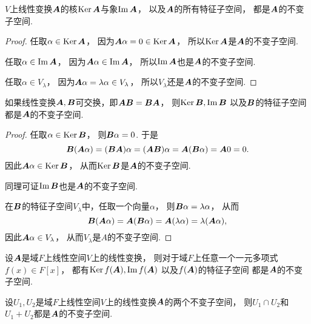\begin{proposition}%
\(V\)上线性变换\(\boldsymbol{A}\)的核\(\operatorname{Ker}\boldsymbol{A}\)与象\(\operatorname{Im}\boldsymbol{A}\)，
以及\(\boldsymbol{A}\)的所有特征子空间，
都是\(\boldsymbol{A}\)的不变子空间.
\begin{proof}
任取\(\alpha \in \operatorname{Ker}\boldsymbol{A}\)，
因为\(\boldsymbol{A}\alpha = 0 \in \operatorname{Ker}\boldsymbol{A}\)，
所以\(\operatorname{Ker}\boldsymbol{A}\)是\(\boldsymbol{A}\)的不变子空间.

任取\(\alpha \in \operatorname{Im}\boldsymbol{A}\)，
因为\(\boldsymbol{A}\alpha \in \operatorname{Im}\boldsymbol{A}\)，
所以\(\operatorname{Im}\boldsymbol{A}\)也是\(\boldsymbol{A}\)的不变子空间.

任取\(\alpha \in V_\lambda\)，
因为\(\boldsymbol{A}\alpha = \lambda \alpha \in V_\lambda\)，
所以\(V_\lambda\)还是\(\boldsymbol{A}\)的不变子空间.
\end{proof}
\end{proposition}

\begin{proposition}%
如果线性变换\(\boldsymbol{A},\boldsymbol{B}\)可交换，即\(\boldsymbol{A}\boldsymbol{B} = \boldsymbol{B}\boldsymbol{A}\)，
则\(\operatorname{Ker}\boldsymbol{B},
\operatorname{Im}\boldsymbol{B}\)
以及\(\boldsymbol{B}\)的特征子空间
都是\(\boldsymbol{A}\)的不变子空间.
\begin{proof}
任取\(\alpha \in \operatorname{Ker}\boldsymbol{B}\)，
则\(\boldsymbol{B}\alpha = 0\).
于是\[
	\boldsymbol{B}(\boldsymbol{A}\alpha)
	= (\boldsymbol{B}\boldsymbol{A})\alpha
	= (\boldsymbol{A}\boldsymbol{B})\alpha
	= \boldsymbol{A}(\boldsymbol{B}\alpha)
	= \boldsymbol{A}0
	= 0.
\]
因此\(\boldsymbol{A}\alpha \in \operatorname{Ker}\boldsymbol{B}\)，
从而\(\operatorname{Ker}\boldsymbol{B}\)是\(\boldsymbol{A}\)的不变子空间.

同理可证\(\operatorname{Im}\boldsymbol{B}\)也是\(\boldsymbol{A}\)的不变子空间.

在\(\boldsymbol{B}\)的特征子空间\(V_\lambda\)中，任取一个向量\(\alpha\)，
则\(\boldsymbol{B}\alpha = \lambda \alpha\)，
从而\[
	\boldsymbol{B}(\boldsymbol{A}\alpha)
	= \boldsymbol{A}(\boldsymbol{B}\alpha)
	= \boldsymbol{A}(\lambda\alpha)
	= \lambda(\boldsymbol{A}\alpha),
\]
因此\(\boldsymbol{A}\alpha \in V_\lambda\)，
从而\(V_\lambda\)是\(A\)的不变子空间.
\end{proof}
\end{proposition}

\begin{corollary}\label{theorem:线性映射.线性变换的不变子空间3}
设\(\boldsymbol{A}\)是域\(F\)上线性空间\(V\)上的线性变换，
则对于域\(F\)上任意一个一元多项式\(f(x) \in F[x]\)，
都有\(\operatorname{Ker} f(\boldsymbol{A}),
\operatorname{Im} f(\boldsymbol{A})\)
以及\(f(\boldsymbol{A})\)的特征子空间
都是\(\boldsymbol{A}\)的不变子空间.
\end{corollary}

\begin{proposition}%
设\(U_1,U_2\)是域\(F\)上线性空间\(V\)上的线性变换\(\boldsymbol{A}\)的两个不变子空间，
则\(U_1 \cap U_2\)和\(U_1 + U_2\)都是\(\boldsymbol{A}\)的不变子空间.
\end{proposition}

